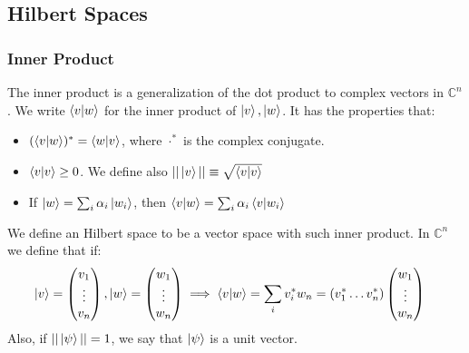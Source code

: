 \documentclass{beamer}
\begin{document}
\subsection{Hilbert Spaces}
\begin{frame}
    \frametitle{Inner Product}
    The inner product is a generalization of the dot product to complex vectors in $\mathbb{C}^n$.
    We write $\braket{v|w}$ for the inner product of $\ket{v}, \ket{w}$.
    It has the properties that:
    \begin{itemize}
        \item $(\braket{v|w})^* = \braket{w|v}$, where $\cdot^*$ is the complex conjugate.
        \item $\braket{v|v} \geq 0$. We define also $||\ket{v}|| \equiv \sqrt{\braket{v|v}}$
        \item If $\ket{w} = \sum_i \alpha_i \ket{w_i}$, then $\braket{v|w} = \sum_i \alpha_i \braket{v | w_i}$
    \end{itemize}
    We define an Hilbert space to be a vector space with such inner product.
    In $\mathbb{C}^n$ we define that if:
    \begin{align}
        \ket{v} & = \begin{pmatrix}
            v_1    \\
            \vdots \\
            v_n
        \end{pmatrix},
        \ket{w} = \begin{pmatrix}
            w_1    \\
            \vdots \\
            w_n
        \end{pmatrix} \implies
        \braket{v|w} = \sum_i v_i^* w_n = (v_1^* \dots v_n^*)\begin{pmatrix}
            w_1    \\
            \vdots \\
            w_n
        \end{pmatrix}
    \end{align}
    Also, if $|| \ket{\psi} || = 1$, we say that $\ket{\psi}$ is a unit vector.
\end{frame}
\end{document}
